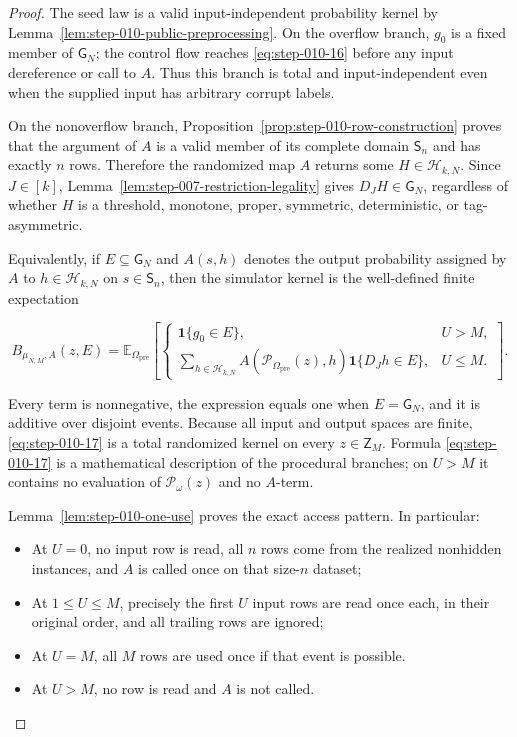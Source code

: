 \begin{proof}
The seed law is a valid input-independent probability kernel by
Lemma~\ref{lem:step-010-public-preprocessing}. On the overflow branch,
\(g_0\) is a fixed member of \(\mathsf G_N\); the control flow reaches \eqref{eq:step-010-16}
before any input dereference or call to \(A\). Thus this branch is total and
input-independent even when the supplied input has arbitrary corrupt
labels.

On the nonoverflow branch,
Proposition~\ref{prop:step-010-row-construction} proves that the argument of
\(A\) is a valid member of its complete domain \(\mathsf S_n\) and has
exactly \(n\) rows. Therefore the randomized map \(A\) returns some
\(H\in\mathcal H_{k,N}\). Since \(J\in[k]\), Lemma~\ref{lem:step-007-restriction-legality} gives
\(D_JH\in\mathsf G_N\), regardless of whether \(H\) is a threshold,
monotone, proper, symmetric, deterministic, or tag-asymmetric.

Equivalently, if \(E\subseteq\mathsf G_N\) and
\(A(s,h)\) denotes the output probability assigned by \(A\) to
\(h\in\mathcal H_{k,N}\) on \(s\in\mathsf S_n\), then the simulator kernel
is the well-defined finite expectation

\[
B_{\mu_{N,M},A}(z,E)
=
\mathbb E_{\Omega_{\mathrm{pre}}}
\left[
\begin{cases}
  \mathbf1\{g_0\in E\}, & U>M,\\[1mm]
  \displaystyle
  \sum_{h\in\mathcal H_{k,N}}
    A(\mathcal P_{\Omega_{\mathrm{pre}}}(z),h)
    \mathbf1\{D_Jh\in E\}, & U\le M.
\end{cases}
\right].
\tag{S10.17}\label{eq:step-010-17}
\]

Every term is nonnegative, the expression equals one when
\(E=\mathsf G_N\), and it is additive over disjoint events. Because all
input and output spaces are finite, \eqref{eq:step-010-17} is a total randomized kernel on
every \(z\in\mathsf Z_M\). Formula \eqref{eq:step-010-17} is a mathematical description of
the procedural branches; on \(U>M\) it contains no evaluation of
\(\mathcal P_\omega(z)\) and no \(A\)-term.

Lemma~\ref{lem:step-010-one-use} proves the exact access pattern. In
particular:

\begin{itemize}
\item At \(U=0\), no input row is read, all \(n\) rows come from the realized
  nonhidden instances, and \(A\) is called once on that size-\(n\) dataset;
\item At \(1\le U\le M\), precisely the first \(U\) input rows are read once
  each, in their original order, and all trailing rows are ignored;
\item At \(U=M\), all \(M\) rows are used once if that event is possible.
\item At \(U>M\), no row is read and \(A\) is not called.
\end{itemize}


\end{proof}
